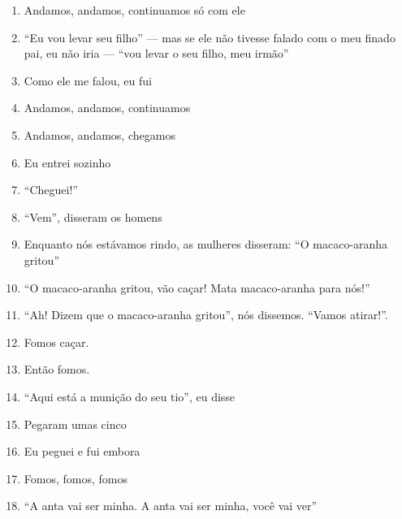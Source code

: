 \begin{enumerate}
 \item Andamos, andamos, continuamos só com ele

 \item ``Eu vou levar seu filho'' --- mas se ele não tivesse falado com o meu
 finado pai, eu não iria --- ``vou levar o seu filho, meu irmão''

 \item Como ele me falou, eu fui

 \begin{center}\end{center}

 \item Andamos, andamos, continuamos

 \item Andamos, andamos, chegamos

 \item Eu entrei sozinho

 \item ``Cheguei!''

 \item ``Vem'', disseram os homens

 \item Enquanto nós estávamos rindo, as mulheres disseram: ``O macaco-aranha gritou''

 \item ``O macaco-aranha gritou, vão caçar! Mata macaco-aranha para nós!''

 \item ``Ah! Dizem que o macaco-aranha gritou'', nós dissemos. ``Vamos atirar!''.

 \item Fomos caçar.

 \item Então fomos.

 \item ``Aqui está a munição do seu tio'', eu disse

 \item Pegaram umas cinco

 \item Eu peguei e fui embora

 \begin{center}\end{center}

 \item Fomos, fomos, fomos

 \item ``A anta vai ser minha. A anta vai ser minha, você vai ver''


\end{enumerate}
